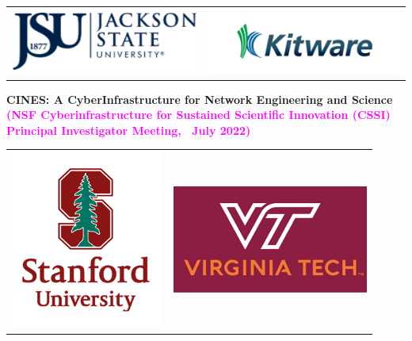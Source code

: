 \documentclass[landscape,paperwidth=70in,paperheight=46in,fontscale=0.225]{baposter} %
\begin{document}
\begin{poster}
{\begin{tabular}{c c}
\includegraphics[scale=0.4]{logos/jsu.png} &
\includegraphics[scale=0.4]{logos/kitware.png} \\
\end{tabular}
}
{\textbf{CINES: A CyberInfrastructure for Network Engineering and Science}
} %
{
            \textcolor{magenta}{%
               \textbf{(NSF Cyberinfrastructure for Sustained Scientific Innovation (CSSI) Principal Investigator Meeting,~ July 2022)}}
            } %
{ 
\begin{tabular}{c c}
\includegraphics[scale=0.4]{logos/stanford.png} &
\includegraphics[scale=0.4]{logos/vt.png} \\

\end{tabular}}
\end{poster}
\end{document}
